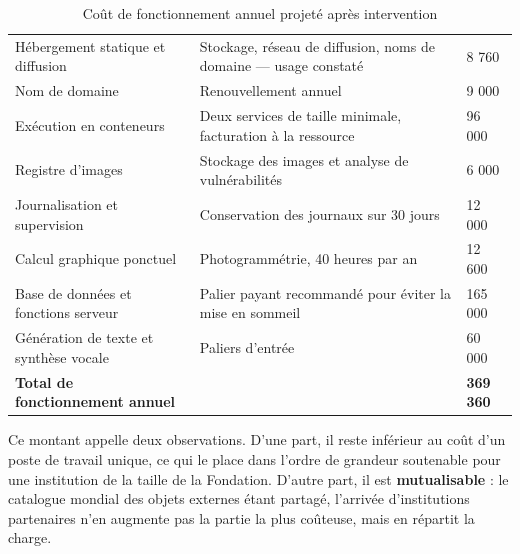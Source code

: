 \begin{table}[htbp]
\centering
\caption{Coût de fonctionnement annuel projeté après intervention}
\label{tab:coutfonctionnement}
\small
\begin{tabularx}{\textwidth}{|L{4.6cm}|X|R{2.6cm}|}
\hline
{}
 &  &  \\ \hline
Hébergement statique et diffusion & Stockage, réseau de diffusion, noms de domaine — usage constaté & 8 760 \\ \hline
Nom de domaine & Renouvellement annuel & 9 000 \\ \hline
Exécution en conteneurs & Deux services de taille minimale, facturation à la ressource & 96 000 \\ \hline
Registre d'images & Stockage des images et analyse de vulnérabilités & 6 000 \\ \hline
Journalisation et supervision & Conservation des journaux sur 30 jours & 12 000 \\ \hline
Calcul graphique ponctuel & Photogrammétrie, 40 heures par an & 12 600 \\ \hline
Base de données et fonctions serveur & Palier payant recommandé pour éviter la mise en sommeil & 165 000 \\ \hline
Génération de texte et synthèse vocale & Paliers d'entrée & 60 000 \\ \hline
{}
\textbf{Total de fonctionnement annuel} & & \textbf{369 360} \\ \hline
\end{tabularx}
\end{table}

Ce montant appelle deux observations. D'une part, il reste inférieur au coût
d'un poste de travail unique, ce qui le place dans l'ordre de grandeur
soutenable pour une institution de la taille de la Fondation. D'autre part, il
est \textbf{mutualisable} : le catalogue mondial des objets externes étant
partagé, l'arrivée d'institutions partenaires n'en augmente pas la partie la
plus coûteuse, mais en répartit la charge.


